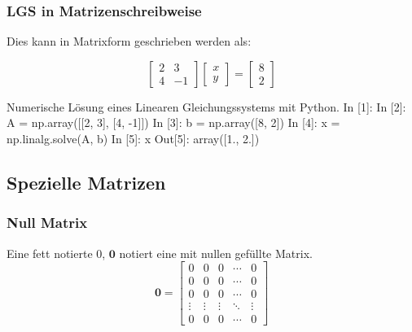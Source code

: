 \subsubsection{LGS in Matrizenschreibweise}


Dies kann in Matrixform geschrieben werden als:

\[
\begin{bmatrix} 2 & 3 \\ 4 & -1 \end{bmatrix}  
\begin{bmatrix} x \\ y \end{bmatrix}  
=
\begin{bmatrix} 8 \\ 2 \end{bmatrix}
\]





\begin{python}{Numerische Lösung eines Linearen Gleichungssystems mit Python.}
In [1]: %
In [2]: A = np.array([[2, 3], [4, -1]])
In [3]: b = np.array([8, 2])
In [4]: x = np.linalg.solve(A, b)
In [5]: x
Out[5]: array([1., 2.])
\end{python}








\subsection{Spezielle Matrizen}

\subsubsection*{Null Matrix}
Eine fett notierte 0, $\mathbf{0}$ notiert eine mit nullen gefüllte Matrix.
\begin{equation}
\mathbf{0} =
\begin{bmatrix}
0 & 0 & 0 & \cdots & 0 \\
0 & 0 & 0 & \cdots & 0 \\
0 & 0 & 0 & \cdots & 0 \\
\vdots & \vdots & \vdots & \ddots & \vdots \\
0 & 0 & 0 & \cdots & 0
\end{bmatrix}
\end{equation} 

